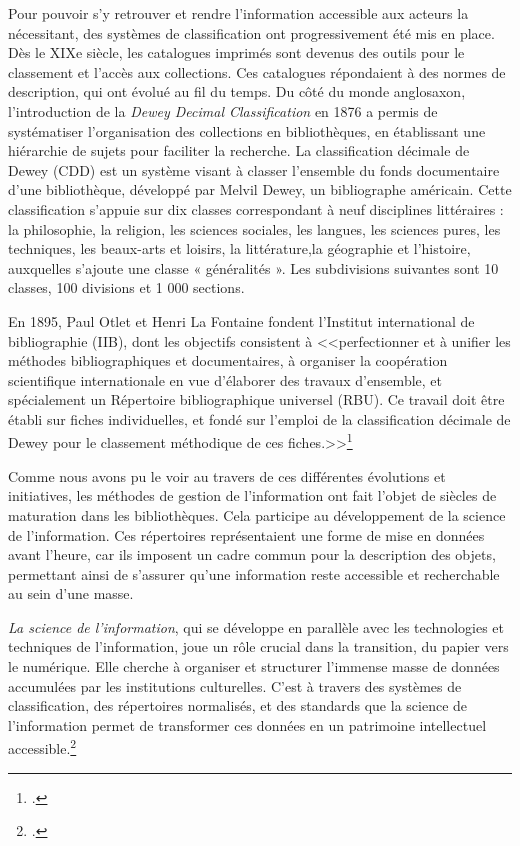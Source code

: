 Pour pouvoir s’y retrouver et rendre l’information accessible aux acteurs la nécessitant, des systèmes de classification ont progressivement été mis en place. Dès le XIXe siècle, les catalogues imprimés sont devenus des outils pour le classement et l'accès aux collections. Ces catalogues répondaient à des normes de description, qui ont évolué au fil du temps.\newline
Du côté du monde anglosaxon, l’introduction de la \emph{Dewey Decimal Classification} en 1876 a permis de systématiser l’organisation des collections en bibliothèques, en établissant une hiérarchie de sujets pour faciliter la recherche. La classification décimale de Dewey (CDD) est un système visant à classer l’ensemble du fonds documentaire d’une bibliothèque, développé par Melvil Dewey, un bibliographe américain.
Cette classification s’appuie sur dix classes correspondant à neuf disciplines littéraires : la  philosophie, la religion, les sciences sociales, les langues, les sciences pures, les techniques, les beaux-arts et loisirs, la littérature,la géographie et l'histoire, auxquelles s’ajoute une classe « généralités ». Les subdivisions suivantes sont 10 classes, 100 divisions et 1 000 sections. \newline

En 1895, Paul Otlet et Henri La Fontaine fondent l’Institut international de bibliographie (IIB), dont les objectifs consistent à <<perfectionner et à unifier les méthodes bibliographiques et documentaires, à organiser la coopération scientifique internationale en vue d’élaborer des travaux d’ensemble, et spécialement un Répertoire bibliographique universel (RBU). Ce travail doit être établi sur fiches individuelles, et fondé sur l’emploi de la classification décimale de Dewey pour le classement méthodique de ces fiches.>>\footcite{fayet_scribe_2000_2}\newline

Comme nous avons pu le voir au travers de ces différentes évolutions et initiatives, les méthodes de gestion de l’information ont fait l’objet de siècles de maturation dans les bibliothèques. Cela participe au développement de la science de l’information. Ces répertoires représentaient une forme de mise en données avant l’heure, car ils imposent un cadre commun pour la description des objets, permettant ainsi de s’assurer qu’une information reste accessible et recherchable au sein d’une masse.\newline

\emph{La science de l’information}, qui se développe en parallèle avec les technologies et techniques de l’information, joue un rôle crucial dans la transition, du papier vers le numérique. Elle cherche à organiser et structurer l’immense masse de données accumulées par les institutions culturelles. C’est à travers des systèmes de classification, des répertoires normalisés, et des standards que la science de l’information permet de transformer ces données en un patrimoine intellectuel accessible.\footcite{fondin_si_2006}\newline

